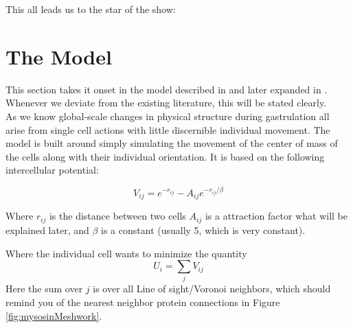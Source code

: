 
% 










This all leads us to the star of the show:

\section{The Model}

This section takes it onset in the model described in  and later expanded in . Whenever we deviate from the existing literature, this will be stated clearly.\\

As we know global-scale changes in physical structure during gastrulation all arise from single cell actions with little discernible individual movement. The model is built around simply simulating the movement of the center of mass of the cells along with their individual orientation. It is based on the following intercellular potential: \reph

\begin{equation}
    V_{ij}=e^{-r_{ij}}-A_{ij}e^{-r_{ij}/\beta}
\end{equation}

Where $r_{ij}$ is the distance between two cells $A_{ij}$ is a attraction factor what will be explained later, and $\beta$ is a constant (usually 5, which is very constant). 

Where the individual cell wants to minimize the quantity 
\begin{equation}
    U_i = \sum_j V_{ij}
    \label{eq:totalPot}
\end{equation}
Here the sum over $j$ is over all Line of sight/Voronoi neighbors, which should remind you of the nearest neighbor protein connections in Figure \ref{fig:mysosinMeshwork}. 


